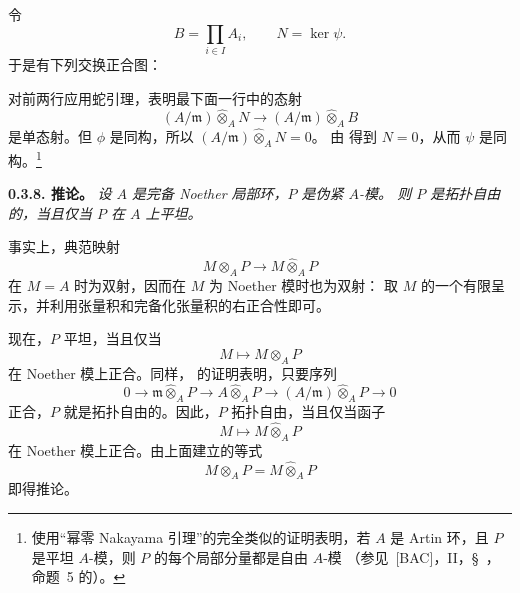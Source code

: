 令
\[
  B=\prod_{i\in I}A_i,
  \qquad
  N=\ker\psi.
\]
于是有下列交换正合图：
\begin{center}
  \label{sga3:VIIB:0.3.7-nakayama-exact-diagram}
  
\end{center}
对前两行应用蛇引理，表明最下面一行中的态射
\[
  (A/\mathfrak m)\widehat{\otimes}_A N
  \longrightarrow
  (A/\mathfrak m)\widehat{\otimes}_A B
\]
是单态射。但 \(\phi\) 是同构，所以 \((A/\mathfrak m)\widehat{\otimes}_A N=0\)。
由  得到 \(N=0\)，从而 \(\psi\) 是同构。\footnote{使用“幂零 Nakayama 引理”的完全类似的证明表明，若 \(A\) 是 Artin 环，且
\(P\) 是平坦 \(A\)-模，则 \(P\) 的每个局部分量都是自由 \(A\)-模
（参见\ \textup{[BAC]}，II，\S~，
命题~5 的）。}

\medskip
\noindent\textbf{0.3.8. 推论。}
\label{sga3:VIIB:0.3.8}
\textit{设 \(A\) 是完备 Noether 局部环，\(P\) 是伪紧 \(A\)-模。
则 \(P\) 是拓扑自由的，当且仅当 \(P\) 在 \(A\) 上平坦。}

事实上，典范映射
\[
  M\otimes_A P\longrightarrow M\widehat{\otimes}_A P
\]
在 \(M=A\) 时为双射，因而在 \(M\) 为 Noether 模时也为双射：
取 \(M\) 的一个有限呈示，并利用张量积和完备化张量积的右正合性即可。

现在，\(P\) 平坦，当且仅当
\[
  M\longmapsto M\otimes_A P
\]
在 Noether 模上正合。同样， 的证明表明，只要序列
\[
  0\longrightarrow
  \mathfrak m\widehat{\otimes}_A P
  \longrightarrow
  A\widehat{\otimes}_A P
  \longrightarrow
  (A/\mathfrak m)\widehat{\otimes}_A P
  \longrightarrow0
\]
正合，\(P\) 就是拓扑自由的。因此，\(P\) 拓扑自由，当且仅当函子
\[
  M\longmapsto M\widehat{\otimes}_A P
\]
在 Noether 模上正合。由上面建立的等式
\[
  M\otimes_A P=M\widehat{\otimes}_A P
\]
即得推论。

